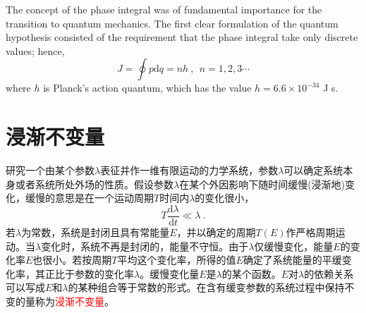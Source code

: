 \documentclass[11pt,a4paper]{article}
\newcommand{\dif}{\mathrm{d}}
\begin{document}
The concept of the phase integral was of fundamental importance for the transition to quantum mechanics. The first clear formulation of the quantum hypothesis consisted of the requirement that the phase integral take only discrete values; hence,
\begin{equation}
J = \oint p \dif q = nh ~, ~~ n = 1, 2, 3 \cdots
\end{equation}
where $h$ is Planck's action quantum, which has the value $h = 6.6 \times 10^{-34}$ J s. 





































\section{浸渐不变量}
研究一个由某个参数$\lambda$表征并作一维有限运动的力学系统，参数$\lambda$可以确定系统本身或者系统所处外场的性质。假设参数$\lambda$在某个外因影响下随时间缓慢(浸渐地)变化，缓慢的意思是在一个运动周期$T$时间内$\lambda$的变化很小，
\begin{equation}
T \dfrac{\dif \lambda}{\dif t} \ll \lambda ~.
\end{equation}
若$\lambda$为常数，系统是封闭且具有常能量$E$，并以确定的周期$T(E)$作严格周期运动。当$\lambda$变化时，系统不再是封闭的，能量不守恒。由于$\lambda$仅缓慢变化，能量$E$的变化率$\dot{E}$也很小。若按周期$T$平均这个变化率，所得的值$\dot{E}$确定了系统能量的平缓变化率，其正比于参数的变化率$\dot{\lambda}$。缓慢变化量$E$是$\lambda$的某个函数。$E$对$\lambda$的依赖关系可以写成$E$和$\lambda$的某种组合等于常数的形式。在含有缓变参数的系统过程中保持不变的量称为\textcolor{red}{浸渐不变量}。
\end{document}

